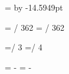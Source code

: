 \tempdimen=\height
\advance\tempdimen by -14.5949pt


\tempdimen=\dimexpr {} / 362\relax
\tempdimentwo=\dimexpr {} / 362\relax

\tempdimen=\dimexpr \tempdimen / 3\relax
\tempdimentwo=\dimexpr \tempdimen / 4\relax

\spaceonedim=\dimexpr 48pt - \tempdimen\relax
\spacetwodim=\dimexpr 34pt - \tempdimentwo\relax

\newcommand{\spaceone}{\the\spaceonedim}
\newcommand{\spacetwo}{\the\spacetwodim}



